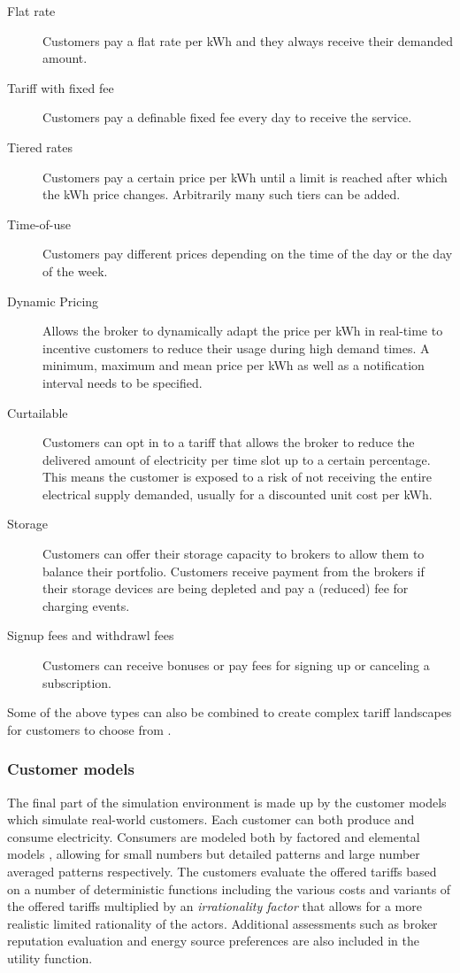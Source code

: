 \begin{description}
    \item[Flat rate] Customers pay a flat rate per kWh and they always receive their demanded
        amount.
    \item[Tariff with fixed fee] Customers pay a definable fixed fee every day to receive the service.
    \item [Tiered rates] Customers pay a certain price per kWh until a limit is reached after which the kWh price
        changes.  Arbitrarily many such tiers can be added.  
    \item[Time-of-use] Customers pay different prices depending
        on the time of the day or the day of the week.  
    \item[Dynamic Pricing] Allows the broker to dynamically adapt the price per kWh in real-time to incentive customers
        to reduce their usage during high demand times. A minimum, maximum and mean price per kWh as well as a
        notification interval needs to be specified.
    \item[Curtailable] Customers can opt in to a tariff that allows the broker to reduce the delivered amount of
        electricity per time slot up to a certain percentage. This means the customer is exposed to a risk of not
        receiving the entire electrical supply demanded, usually for a discounted unit cost per kWh.  \item[Storage]
        Customers can offer their storage capacity to brokers to allow them to balance their portfolio. Customers
        receive payment from the brokers if their storage devices are being depleted and pay a (reduced) fee for charging
        events.
    \item[Signup fees and withdrawl fees] Customers can receive bonuses or pay fees
        for signing up or canceling a subscription.
\end{description}

\noindent Some of the above types can also be combined to create complex tariff landscapes for customers to choose from \citep[p.9]{ketter2018powertac}.

\subsubsection{Customer models}%

The final part of the simulation environment is made up by the customer models which simulate real-world customers.
Each customer can both produce and consume electricity. Consumers are modeled both by factored and elemental models
\citep[p.14]{ketter2018powertac}, allowing for small numbers but detailed patterns and large number averaged
patterns respectively. The customers evaluate the offered tariffs based on a number of deterministic functions
including the various costs and variants of the offered tariffs multiplied by an \emph{irrationality factor} that
allows for a more realistic limited rationality of the actors. Additional assessments such as broker reputation
evaluation and energy source preferences are also included in the utility function.

